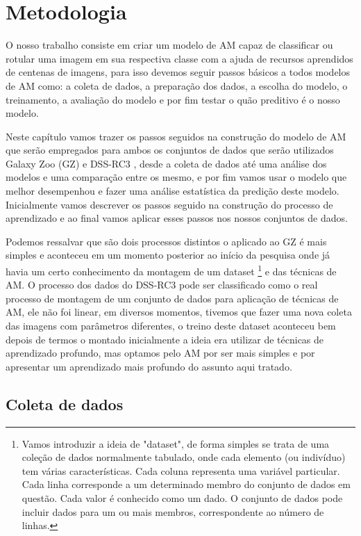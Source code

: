 \chapter{Metodologia} 

O nosso trabalho consiste em criar um modelo de AM capaz de classificar ou rotular uma imagem em sua respectiva classe com a ajuda de recursos aprendidos de centenas de imagens, para isso devemos seguir passos básicos a todos modelos de AM como: a coleta de dados, a preparação dos dados, a escolha do modelo, o treinamento, a avaliação do modelo e por fim testar o quão preditivo é o nosso modelo.  

Neste capítulo vamos trazer os passos seguidos na construção do modelo de AM que serão empregados para ambos os conjuntos de dados que serão utilizados Galaxy Zoo (GZ) e DSS-RC3 , desde a coleta de dados até uma análise dos modelos e uma comparação entre os mesmo, e por fim vamos usar o modelo que melhor desempenhou e fazer uma análise estatística da predição deste modelo. Inicialmente vamos descrever os passos seguido na construção do processo de aprendizado e ao final vamos aplicar esses passos nos nossos conjuntos de dados. 

Podemos ressalvar que são dois processos distintos o aplicado ao GZ é mais simples e aconteceu em um momento posterior ao início  da pesquisa onde já havia um certo conhecimento da montagem de um dataset \footnote{Vamos introduzir a ideia de "dataset", de forma simples se trata de uma coleção de dados normalmente tabulado, onde cada elemento (ou indivíduo) tem várias características. Cada coluna representa uma variável particular. Cada linha corresponde a um determinado membro do conjunto de dados em questão. Cada valor é conhecido como um dado. O conjunto de dados pode incluir dados para um ou mais membros, correspondente ao número de linhas.} e das técnicas de AM. O processo dos dados do DSS-RC3 pode ser classificado como o real processo de montagem de um conjunto de dados para aplicação de técnicas de AM, ele não foi linear, em diversos momentos, tivemos que fazer uma nova coleta das imagens com parâmetros diferentes, o treino deste dataset aconteceu bem depois de termos o montado inicialmente a ideia era utilizar de técnicas de aprendizado profundo, mas optamos pelo AM por ser mais simples e por apresentar um aprendizado mais profundo do assunto aqui tratado. 

\section{Coleta de dados} 

